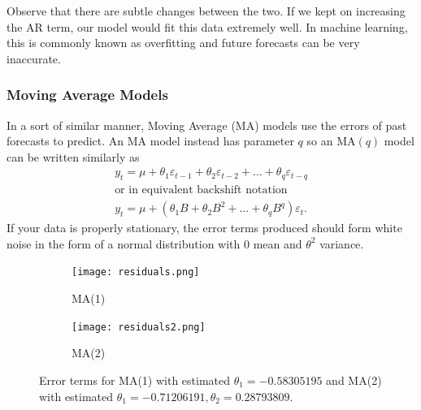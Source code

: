 \documentclass{article}
\begin{document}
    Observe that there are subtle changes between the two. If we kept on increasing the AR term, our model would fit this data extremely well. In machine learning, this is commonly known as overfitting and future forecasts can be very inaccurate.

  \subsubsection{Moving Average Models}
    In a sort of similar manner, Moving Average (MA) models use the errors of past forecasts to predict. An MA model instead has parameter $q$ so an MA$(q)$ model can be written similarly as
    \begin{gather*}
      y_t = \mu + \theta_1 \varepsilon_{t-1} + \theta_2 \varepsilon_{t-2} + ... + \theta_q \varepsilon_{t-q}\\
      \text{or in equivalent backshift notation}\\
      y_t = \mu + (\theta_1B + \theta_2B^2 + ... + \theta_qB^q)\varepsilon_t.
    \end{gather*}
    If your data is properly stationary, the error terms produced should form white noise in the form of a normal distribution with $0$ mean and $\theta^2$ variance.

    \begin{figure}[H]
      \centering
      \captionsetup{justification=centering}
      \begin{subfigure}[b]{0.49\linewidth}
        \texttt{[image: residuals.png]}
        \caption{MA(1)}
      \end{subfigure}
      \begin{subfigure}[b]{0.49\linewidth}
        \texttt{[image: residuals2.png]}
        \caption{MA(2)}
      \end{subfigure}
      \caption{Error terms for MA(1) with estimated $\theta_1 = -0.58305195$ and MA(2) with estimated $\theta_1 = -0.71206191, \theta_2 =  0.28793809$.}
    \end{figure}
\end{document}
